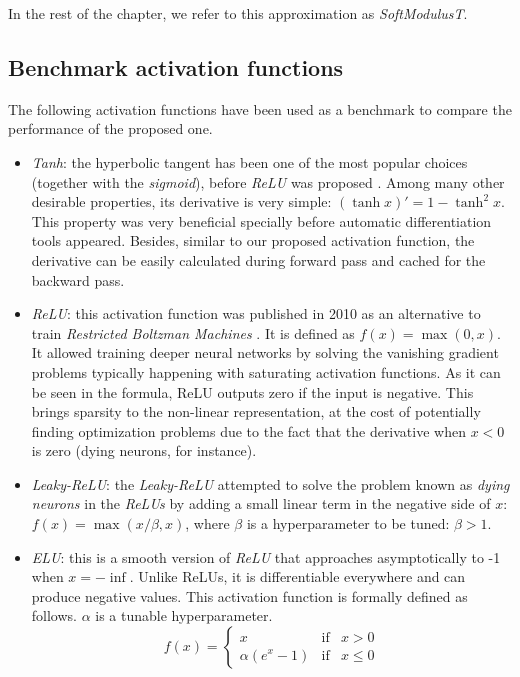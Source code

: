 In the rest of the chapter, we refer to this approximation as \textit{SoftModulusT}.


\subsection{Benchmark activation functions}
The following activation functions have been used as a benchmark to compare the performance of the proposed one.


\begin{itemize}
	\item \textit{Tanh}: the hyperbolic tangent has been one of the most popular choices (together with the \textit{sigmoid}), before \textit{ReLU} was proposed \autocite{lecun2012}. Among many other desirable properties, its derivative is very simple: $(\tanh x)'=1-\tanh^2 x$. This property was very beneficial specially before automatic differentiation tools appeared. Besides, similar to our proposed activation function, the derivative can be easily calculated during forward pass and cached for the backward pass.
	\item \textit{ReLU}: this activation function was published in 2010 as an alternative to train \textit{Restricted Boltzman Machines} \autocite{nair2010}. It is defined as $f(x) = \max(0,x)$. It allowed training deeper neural networks by solving the vanishing gradient problems typically happening with saturating activation functions. As it can be seen in the formula, ReLU outputs zero if the input is negative. This brings sparsity to the non-linear representation, at the cost of potentially finding optimization problems due to the fact that the derivative when $x<0$ is zero (dying neurons, for instance).
	\item \textit{Leaky-ReLU}: the \textit{Leaky-ReLU} \autocite{xu2015} attempted to solve the problem known as \textit{dying neurons} in the \textit{ReLUs} by adding a small linear term in the negative side of $x$: $f(x) = \max(x/\beta, x)$, where $\beta$ is a hyperparameter to be tuned: $\beta>1$.
	\item \textit{ELU}: this is a smooth version of \textit{ReLU} \autocite{djork2016} that approaches asymptotically to -1 when $x=-\inf$. Unlike ReLUs, it is differentiable everywhere and can produce negative values. This activation function is formally defined as follows. $\alpha$ is a tunable hyperparameter.
	$$
	f(x)= \left\{ \begin{array}{lcc}
		x &   \text{if}  & x > 0 \\
 \alpha(e^x - 1) &  \text{if} & x \leq 0
	\end{array}
	\right.
	$$


\end{itemize}
